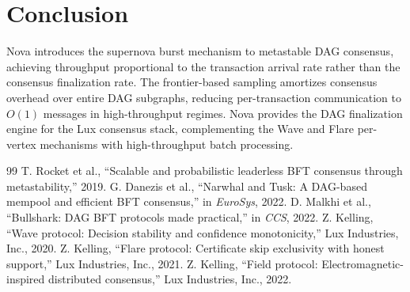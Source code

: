 \section{Conclusion}

\label{sec:conclusion}

Nova introduces the supernova burst mechanism to metastable DAG consensus, achieving
throughput proportional to the transaction arrival rate rather than the consensus
finalization rate. The frontier-based sampling amortizes consensus overhead over
entire DAG subgraphs, reducing per-transaction communication to $O(1)$ messages in
high-throughput regimes. Nova provides the DAG finalization engine for the Lux
consensus stack, complementing the Wave and Flare per-vertex mechanisms with
high-throughput batch processing.

\begin{thebibliography}{99}
 T. Rocket et al., ``Scalable and probabilistic leaderless BFT consensus through metastability,'' 2019.
 G. Danezis et al., ``Narwhal and Tusk: A DAG-based mempool and efficient BFT consensus,'' in \emph{EuroSys}, 2022.
 D. Malkhi et al., ``Bullshark: DAG BFT protocols made practical,'' in \emph{CCS}, 2022.
 Z. Kelling, ``Wave protocol: Decision stability and confidence monotonicity,'' Lux Industries, Inc., 2020.
 Z. Kelling, ``Flare protocol: Certificate skip exclusivity with honest support,'' Lux Industries, Inc., 2021.
 Z. Kelling, ``Field protocol: Electromagnetic-inspired distributed consensus,'' Lux Industries, Inc., 2022.
\end{thebibliography}

